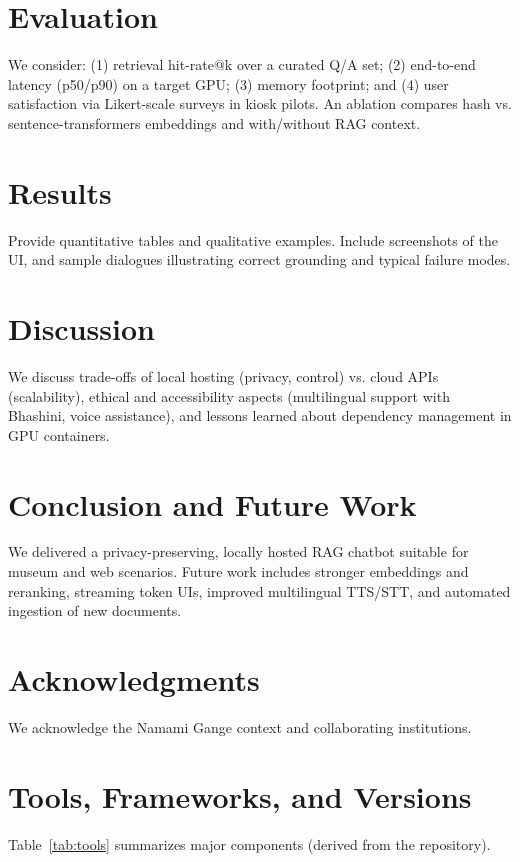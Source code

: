 \documentclass[conference]{IEEEtran}
\begin{document}
\section{Evaluation}
We consider: (1) retrieval hit-rate@k over a curated Q/A set; (2) end-to-end latency (p50/p90) on a target GPU; (3) memory footprint; and (4) user satisfaction via Likert-scale surveys in kiosk pilots. An ablation compares hash vs. sentence-transformers embeddings and with/without RAG context.

\section{Results}
Provide quantitative tables and qualitative examples. Include screenshots of the UI, and sample dialogues illustrating correct grounding and typical failure modes.

\section{Discussion}
We discuss trade-offs of local hosting (privacy, control) vs. cloud APIs (scalability), ethical and accessibility aspects (multilingual support with Bhashini, voice assistance), and lessons learned about dependency management in GPU containers.

\section{Conclusion and Future Work}
We delivered a privacy-preserving, locally hosted RAG chatbot suitable for museum and web scenarios. Future work includes stronger embeddings and reranking, streaming token UIs, improved multilingual TTS/STT, and automated ingestion of new documents.

\section*{Acknowledgments}
We acknowledge the Namami Gange context and collaborating institutions.

\section*{Tools, Frameworks, and Versions}
Table~\ref{tab:tools} summarizes major components (derived from the repository).
\end{document}
